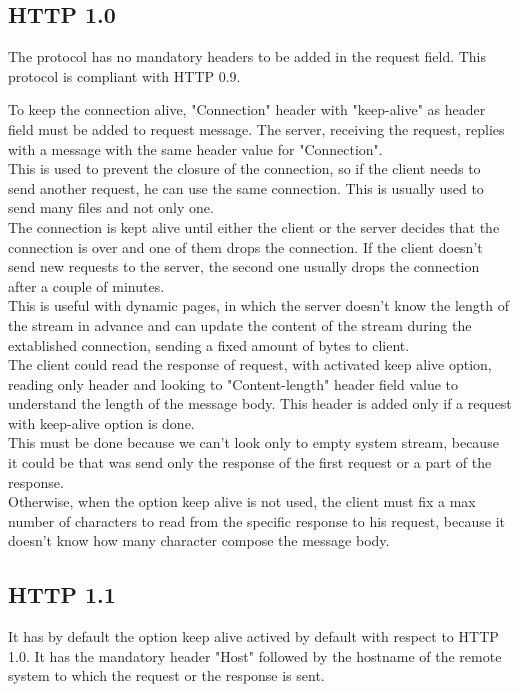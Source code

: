 \subsection{HTTP 1.0}
The protocol has no mandatory headers to be added in the request field. This protocol is compliant with HTTP 0.9.

To keep the connection alive, "Connection" header with "keep-alive" as header field must be added to request message. The server, receiving the request, replies with a message with the same header value for "Connection".\\
This is used to prevent the closure of the connection, so if the client needs to send another request, he can use the same connection.
This is usually used to send many files and not only one.\\
The connection is kept alive until either the client or the server decides that the connection is over and one of them drops the connection. If the client doesn't send new requests to the server, the second one usually drops the connection after a couple of minutes.\\
This is useful with dynamic pages, in which the server doesn't know the length of the stream in advance and can update the content of the stream during the extablished connection, sending a fixed amount of bytes to client.\\
The client could read the response of request, with activated keep alive option, reading only header and looking to "Content-length" header field value to understand the length of the message body. This header is added only if a request with keep-alive option is done.\\
This must be done because we can't look only to empty system stream, because it could be that was send only the response of the first request or a part of the response.\\
Otherwise, when the option keep alive is not used, the client must fix a max number of characters to read from the specific response to his request, because it doesn't know how many character compose the message body.

\subsection{HTTP 1.1}
It has by default the option keep alive actived by default with respect to HTTP 1.0. It has the mandatory header "Host" followed by the hostname of the remote system to which the request or the response is sent. 

